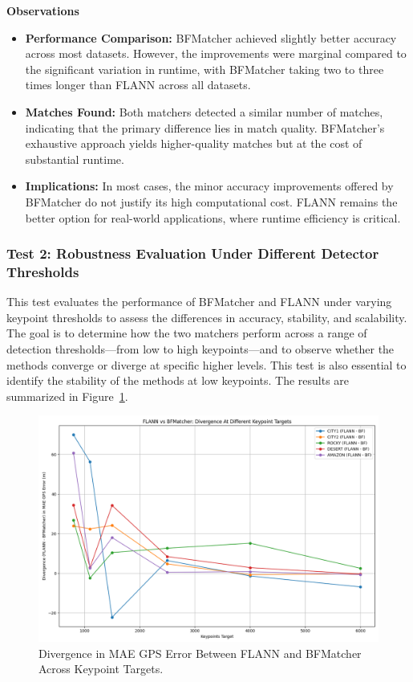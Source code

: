 \textbf{Observations}
\begin{itemize}
    \item \textbf{Performance Comparison:}  
    BFMatcher achieved slightly better accuracy across most datasets. However, the improvements were marginal compared to the significant variation in runtime, with BFMatcher taking two to three times longer than FLANN across all datasets.

    \item \textbf{Matches Found:}  
    Both matchers detected a similar number of matches, indicating that the primary difference lies in match quality. BFMatcher’s exhaustive approach yields higher-quality matches but at the cost of substantial runtime.

    \item \textbf{Implications:}  
    In most cases, the minor accuracy improvements offered by BFMatcher do not justify its high computational cost. FLANN remains the better option for real-world applications, where runtime efficiency is critical.
\end{itemize}




\subsubsection*{Test 2: Robustness Evaluation Under Different Detector Thresholds}

This test evaluates the performance of BFMatcher and FLANN under varying keypoint thresholds to assess the differences in accuracy, stability, and scalability. The goal is to determine how the two matchers perform across a range of detection thresholds—from low to high keypoints—and to observe whether the methods converge or diverge at specific higher levels. This test is also essential to identify the stability of the methods at low keypoints. The results are summarized in Figure~\ref{fig:divergence_plot}.

\begin{figure}[H]
    \centering
    \includegraphics[width=\textwidth]{./Graphs/Divergence_BF_FLANN_KPS.png}
    \caption{Divergence in MAE GPS Error Between FLANN and BFMatcher Across Keypoint Targets.}
    \label{fig:divergence_plot}
\end{figure}

